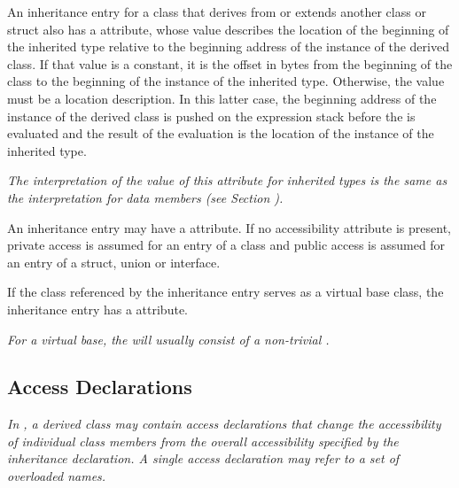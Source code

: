 An inheritance entry 
for a class that derives from or extends
\hypertarget{chap:DWATdatamemberlocationinheritedmemberlocation}{}
another class or struct also has 
a 
\DWATdatamemberlocation{}
attribute, whose value describes the location of the beginning
of the inherited type relative to the beginning address of the
instance of the derived class. If that value is a constant, it is the offset
in bytes from the beginning of the class to the beginning of
the instance of the inherited type. Otherwise, the value must be a location
description. In this latter case, the beginning address of
the instance of the derived class is pushed on the expression stack before
the 
is evaluated and the result of the
evaluation is the location of the instance of the inherited type.

\textit{The interpretation of the value of this attribute for
inherited types is the same as the interpretation for data
members 
(see Section ).  }

An 
inheritance entry 
\hypertarget{chap:DWATaccessibilitycppinheritedmembers}{}
may 
have a
\DWATaccessibility{}
attribute. 
If no accessibility attribute is present, private access 
is assumed for an entry of a class and public access is 
assumed for an entry of a struct, union or interface.

If\hypertarget{chap:DWATvirtualityvirtualityofbaseclass}{}
the class referenced by the 
inheritance entry serves
as a  virtual base class, the inheritance entry has a
\DWATvirtuality{} attribute.

\textit{For a  virtual base, the 
will usually consist of a non-trivial 
.}

\subsection{Access Declarations}
\label{chap:accessdeclarations}

\textit{In , a derived class may contain access declarations that
change the accessibility of individual class members from the
overall accessibility specified by the inheritance declaration.
A single access declaration may refer to a set of overloaded
names.}

